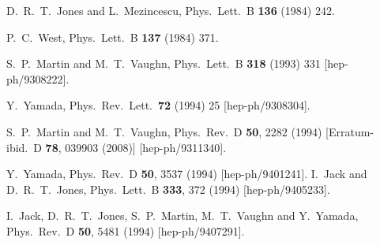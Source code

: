 \documentclass[final,3p,11pt,pdflatex]{elsarticle}
\begin{document}
\begin{thebibliography}{100}
  D.~R.~T.~Jones and L.~Mezincescu,
  Phys.\ Lett.\ B {\bf 136} (1984) 242.

  P.~C.~West,
  Phys.\ Lett.\ B {\bf 137} (1984) 371.

  S.~P.~Martin and M.~T.~Vaughn,
  Phys.\ Lett.\ B {\bf 318} (1993) 331
  [hep-ph/9308222].

  Y.~Yamada,
  Phys.\ Rev.\ Lett.\  {\bf 72} (1994) 25
  [hep-ph/9308304].

  S.~P.~Martin and M.~T.~Vaughn,
  Phys.\ Rev.\ D {\bf 50}, 2282 (1994)
  [Erratum-ibid.\ D {\bf 78}, 039903 (2008)]
  [hep-ph/9311340].



  Y.~Yamada,
  Phys.\ Rev.\ D {\bf 50}, 3537 (1994)
  [hep-ph/9401241].
  I.~Jack and D.~R.~T.~Jones,
  Phys.\ Lett.\ B {\bf 333}, 372 (1994)
  [hep-ph/9405233].

  I.~Jack, D.~R.~T.~Jones, S.~P.~Martin, M.~T.~Vaughn and Y.~Yamada,
  Phys.\ Rev.\ D {\bf 50}, 5481 (1994)
  [hep-ph/9407291].


\end{thebibliography}
\end{document}
